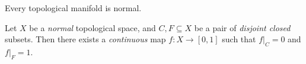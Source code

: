 \begin{corollary}
    \label{cor:manifold-is-normal}
    Every topological manifold is normal.
\end{corollary}

\begin{theorem}[Urysohn]
    \label{thm:urysohn}
    Let \(X\) be a \emph{normal} topological space, and \(C, F \subseteq X\) be a
    pair of \emph{disjoint closed} subsets. Then there exists a \emph{continuous}
    map \(f: X \to [0, 1]\) such that \(f|_C = 0\) and \(f|_F = 1\).
\end{theorem}


